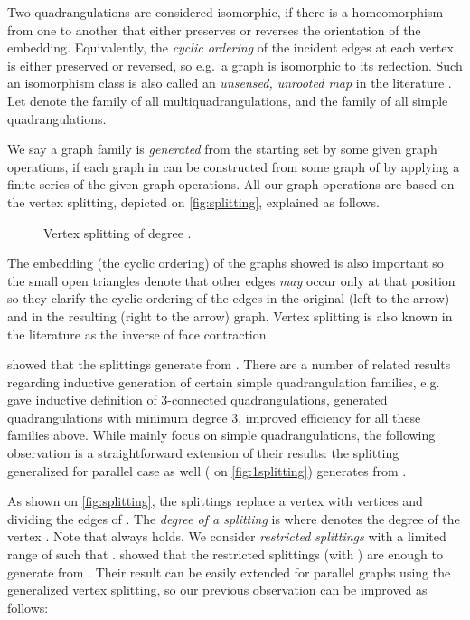 \documentclass[]{article}
\begin{document}
Two quadrangulations are considered isomorphic, if there is a homeomorphism from one to another that either preserves or reverses the orientation of the embedding.
Equivalently, the \emph{cyclic ordering} of the incident edges at each vertex is either preserved or reversed, so e.g.\  a graph is isomorphic to its reflection.
Such an isomorphism class is also called an \emph{unsensed, unrooted map} in the literature \cite{Walsh2007}.
Let  denote the family of all multiquadrangulations, and  the family of all simple quadrangulations.

We say a graph family  is \emph{generated} from the starting set  by some given graph operations, if each graph in  can be constructed from some graph of  by applying a finite series of the given graph operations.
All our graph operations are based on the vertex splitting, depicted on \autoref{fig:splitting}, explained as follows.
\begin{figure}\centering
  \qquad
  \caption{Vertex splitting of degree .}
  \label{fig:splitting}
\end{figure}
The embedding (the cyclic ordering) of the graphs showed is also important so the small open triangles denote that other edges \emph{may} occur only at that position so they clarify the cyclic ordering of the edges in the original (left to the arrow) and in the resulting (right to the arrow) graph.
Vertex splitting is also known in the literature as the inverse of face contraction.

\citet{Batagelj1989, Negami1993} showed that the splittings generate  from .
There are a number of related results regarding inductive generation of certain simple quadrangulation families, e.g.\ 
\citet{Batagelj1989} gave inductive definition of 3-connected quadrangulations,
\citet{Nakamoto1999} generated quadrangulations with minimum degree 3, \citet{Brinkmann2005} improved efficiency for all these families above.
While \cite{Batagelj1989, Negami1993, Nakamoto1996b} mainly focus on simple quadrangulations, the following observation is a straightforward extension of their results: the splitting generalized for parallel case as well ( on \autoref{fig:1splitting}) generates  from .

As shown on \autoref{fig:splitting}, the splittings replace a vertex  with vertices  and  dividing the edges of .
The \emph{degree of a splitting} is  where  denotes the degree of the vertex .
Note that  always holds.
We consider \emph{restricted splittings}  with a limited range of  such that .
\citet{Brinkmann2005} showed that the restricted splittings  (with ) are enough to generate  from .
Their result can be easily extended for parallel graphs using the generalized vertex splitting, so our previous observation can be improved as follows:
\end{document}
